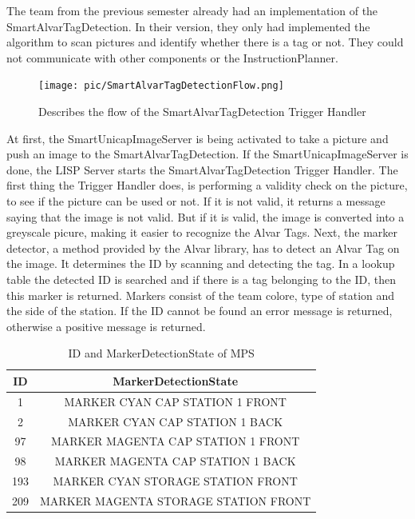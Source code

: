 The team from the previous semester already had an implementation of the SmartAlvarTagDetection. In their version, they only had implemented the algorithm to scan pictures and identify whether there is a tag or not. They could not communicate with other components or the InstructionPlanner. \\

\begin{figure}[h]
\centering
\texttt{[image: pic/SmartAlvarTagDetectionFlow.png]}
\caption{Describes the flow of the SmartAlvarTagDetection Trigger Handler}
\label{fig:smartAlvarFlow}
\end{figure}


At first, the SmartUnicapImageServer is being activated to take a picture and push an image to the SmartAlvarTagDetection. If the SmartUnicapImageServer is done, the LISP Server starts the SmartAlvarTagDetection Trigger Handler. The first thing the Trigger Handler does, is performing a validity check on the picture, to see if the picture can be used or not. If it is not valid, it returns a message saying that the image is not valid. But if it is valid, the image is converted into a greyscale picure, making it easier to recognize the Alvar Tags. Next, the marker detector, a method provided by the Alvar library, has to detect an Alvar Tag on the image. It determines the ID by scanning and detecting the tag. In a lookup table the detected ID is searched and if there is a tag belonging to the ID, then this marker is returned. Markers consist of the team colore, type of station and the side of the station. If the ID cannot be found an error message is returned, otherwise a positive message is returned. \\

\begin {table}[h]
\caption{ID and MarkerDetectionState of MPS}
\label{tab:alvar_mps}
\begin{center}

 \begin{tabular}{|c | c|}
 \hline
 ID & MarkerDetectionState \\ [0.5ex] 
 \hline\hline
 1 & MARKER CYAN CAP STATION 1 FRONT \\ 
 \hline
 2 & MARKER CYAN CAP STATION 1 BACK \\
 \hline
 97 & MARKER MAGENTA CAP STATION 1 FRONT \\
 \hline
 98 & MARKER MAGENTA CAP STATION 1 BACK \\
 \hline
 193 & MARKER CYAN STORAGE STATION FRONT \\ [1ex] 
 \hline
 209 & MARKER MAGENTA STORAGE STATION FRONT \\ [1ex] 
 \hline
\end{tabular}
\end{center}
\end{table}

